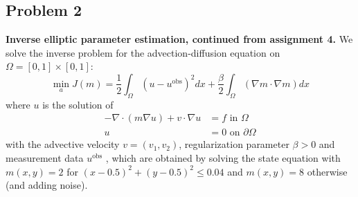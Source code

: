 \documentclass[11pt]{article}
\begin{document}
\subsection*{Problem 2}
\textbf{Inverse elliptic parameter estimation, continued from assignment
4.} We solve 
the inverse problem for the advection-diffusion equation on $\Omega =
[0, 1] \times [0, 1]$: 
\begin{equation}
\min_a J(m) = \frac{1}{2}\int_\Omega(u-u^{\text{obs}})^2dx +
 \frac{\beta}{2}\int_\Omega (\nabla m \cdot \nabla m)dx \tag{8}
 \label{2cost} 
\end{equation}
where $u$ is the solution of
\begin{align}
-\nabla\cdot(m\nabla u) + v\cdot\nabla u &= f \text{ in } \Omega
 \\ 
u &= 0 \text{ on } \partial \Omega 
\end{align}
with the advective velocity $v = (v_1 , v_2 )$, regularization parameter
$\beta > 0$ and measurement data $u^{\text{obs}}$ , which are obtained by
solving the state equation with $m(x, y) = 2$ for $(x - 0.5)^2 + (y -
0.5)^2 \le 0.04$ and $m(x, y) = 8$ otherwise (and adding noise). 
\end{document}
